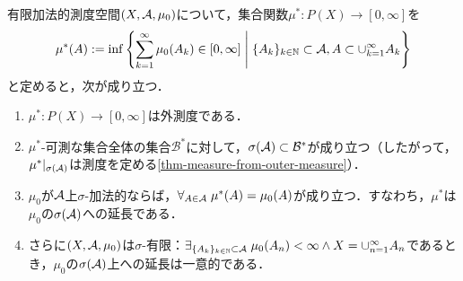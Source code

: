 \documentclass[uplatex, dvipdfmx]{jsreport}
\renewcommand{\B}{\mathcal{B}}
\begin{document}
\begin{lemma}\label{lemma-Hahn-Kolmogorov}
    有限加法的測度空間$(X,\mathcal{A},\mu_0)$について，集合関数$\mu^*:P(X)\to[0,\infty]$を
    \[\mu^*(A):=\inf\left\{\sum^\infty_{k=1}\mu_0(A_k)\in[0,\infty]\;\middle|\; \{A_k\}_{k\in\mathbb{N}}\subset\mathcal{A},A\subset\cup^\infty_{k=1}A_k\right\}\]と定めると，次が成り立つ．
    \begin{enumerate}
        \item $\mu^*:P(X)\to[0,\infty]$は外測度である．
        \item $\mu^*$-可測な集合全体の集合$\B^*$に対して，$\sigma(\A)\subset\B^*$が成り立つ（したがって，$\mu^*|_{\sigma(\mathcal{A})}$は測度を定める\ref{thm-measure-from-outer-measure}）．
        \item $\mu_0$が$\mathcal{A}$上$\sigma$-加法的ならば，$\forall_{A\in\mathcal{A}}\;\mu^*(A)=\mu_0(A)$が成り立つ．すなわち，$\mu^*$は$\mu_0$の$\sigma(\mathcal{A})$への延長である．
        \item さらに$(X,\mathcal{A},\mu_0)$は$\sigma$-有限：$\exists_{\{A_k\}_{k\in\mathbb{N}}\subset\mathcal{A}}\;\mu_0(A_n)<\infty\land X=\cup^\infty_{n=1}A_n$であるとき，$\mu_0$の$\sigma(\mathcal{A})$上への延長は一意的である．
    \end{enumerate}
\end{lemma}
\end{document}
